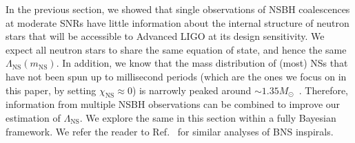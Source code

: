\documentclass[aps,prd,amsmath,floats,floatfix, twocolumn,
superscriptaddress,nofootinbib,showpacs]{revtex4-1}
\newcommand{\lambdans}{\Lambda_\mathrm{NS}}
\newcommand{\chins}{\chi_\mathrm{NS}}
\newcommand{\mns}{m_\mathrm{NS}}
\begin{document}
In the previous section, we showed that single observations of NSBH
coalescences at moderate SNRs have little information about the internal
structure of neutron stars that will be accessible to Advanced LIGO at its
design sensitivity. We expect all neutron stars to share the same equation of
state, and hence the same $\lambdans(\mns)$. In addition, we know that the mass
distribution of (most) NSs that have not been spun up to millisecond periods
(which are the ones we focus on in this paper, by setting $\chins\approx 0$) is
narrowly peaked around $\sim 1.35M_\odot$~\cite{Kiziltan2013}. Therefore,
information from multiple NSBH observations can be combined to improve our
estimation of $\lambdans$. We explore the same in this section within a fully
Bayesian framework. We refer the reader to Ref.~\cite{Mandel:2009pc,Lackey2014,
Wade:2014vqa} for similar analyses of BNS inspirals.
\end{document}
